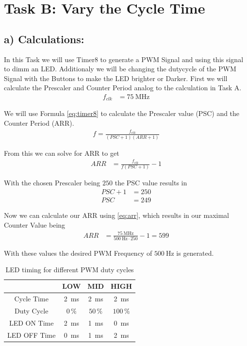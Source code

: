 \section{Task B: Vary the Cycle Time}

\subsection{a) Calculations:}
In this Task we will use Timer8 to generate a PWM Signal and using this signal to dimm an LED. Additionaly we will be changing the dutycycle of the PWM Signal with the Buttons to make the LED brighter or Darker. First we will calculate the Prescaler and Counter Period analog to the calculation in Task A.
\begin{align}
	f_{clk} &= \SI{75}{\mega\hertz}
\end{align}

We will use Formula \ref{eq:timer8} to calculate the Prescaler value (PSC) and the Counter Period (ARR).
\begin{align}\label{eq:timer8}
	f = \frac{f_{clk}}{(PSC + 1)(ARR + 1)}
\end{align}

From this we can solve for ARR to get
\begin{align}\label{eq:arr}
	ARR &= \frac{f_{clk}}{f(PSC + 1)} - 1
\end{align}

With the chosen Prescaler being $250$ the PSC value results in 
\begin{align}
	PSC + 1 &= 250 \\
	PSC &= 249
\end{align}

Now we can calculate our ARR using \ref{eq:arr}, which results in our maximal Counter Value being 
\begin{align}
	ARR &= \frac{\SI{75}{\mega\hertz}}{\SI{500}{\hertz} \cdot \num{250}} - 1 = \num{599}
\end{align}

With these values the desired PWM Frequency of $\SI{500}{\hertz}$ is generated.

\begin{table}[h]
	\centering
	\begin{tabular}{|c|c|c|c|}
		\hline
		& \textbf{LOW} & \textbf{MID} & \textbf{HIGH} \\ \hline
		Cycle Time & \SI{2}{\milli\second} & \SI{2}{\milli\second} & \SI{2}{\milli\second} \\ \hline
		Duty Cycle & $0\,\%$ & $50\,\%$ & $100\,\%$ \\ \hline
		LED ON Time & \SI{2}{\milli\second} & \SI{1}{\milli\second} & \SI{0}{\milli\second} \\ \hline
		LED OFF Time & \SI{0}{\milli\second} & \SI{1}{\milli\second} & \SI{2}{\milli\second} \\ \hline
	\end{tabular}
	\caption{LED timing for different PWM duty cycles}
	\label{tab:led_pwm}
\end{table}
\pagebreak

